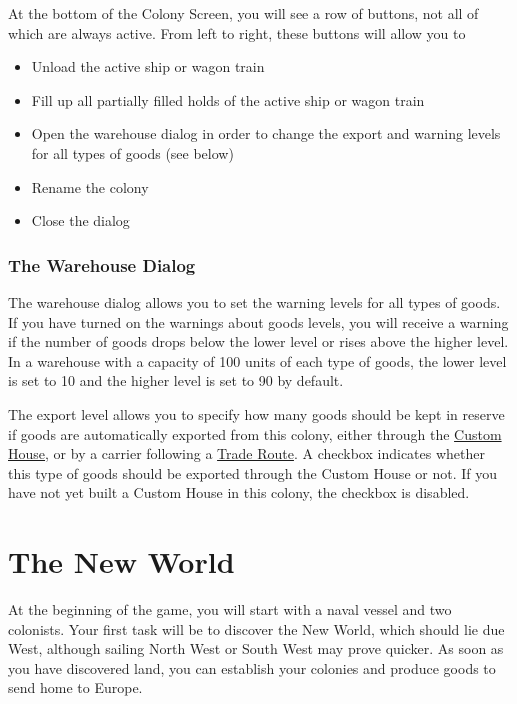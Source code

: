 \documentclass[12pt]{book}
\begin{document}
At the bottom of the Colony Screen, you will see a row of buttons, not
all of which are always active. From left to right, these buttons will
allow you to

\begin{itemize}
\item Unload the active ship or wagon train
\item Fill up all partially filled holds of the active ship or
wagon train
\item Open the warehouse dialog in order to change the export and
warning levels for all types of goods (see below)
\item Rename the colony
\item Close the dialog
\end{itemize}


\hypertarget{The Warehouse Dialog}{\subsection{The Warehouse Dialog}}

The warehouse dialog allows you to set the warning levels for all
types of goods. If you have turned on the warnings about goods levels,
you will receive a warning if the number of goods drops below the
lower level or rises above the higher level. In a warehouse with a
capacity of 100 units of each type of goods, the lower level is set to
10 and the higher level is set to 90 by default.

The export level allows you to specify how many goods should be kept
in reserve if goods are automatically exported from this colony,
either through the \hyperlink{Custom House}{Custom House}, or by a
carrier following a \hyperlink{Trade Routes}{Trade Route}. A checkbox
indicates whether this type of goods should be exported through the
Custom House or not. If you have not yet built a Custom House in this
colony, the checkbox is disabled.


\hypertarget{The New World}{\chapter{The New World}}

At the beginning of the game, you will start with a naval vessel and
two colonists. Your first task will be to discover the New World,
which should lie due West, although sailing North West or South West
may prove quicker. As soon as you have discovered land, you can
establish your colonies and produce goods to send home to Europe.
\end{document}
